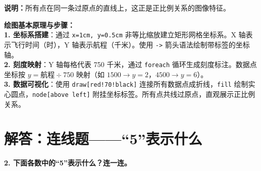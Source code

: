 \documentclass[12pt, a4paper]{ctexrep}
\begin{document}
\begin{center}
\end{center}

\vspace{0.4cm}

{\small\color{gray}
\textbf{说明：}所有点在同一条过原点的直线上，这正是正比例关系的图像特征。}

\vspace{0.6cm}

{\small\color{blue!70!black}
\textbf{绘图基本原理与步骤：}\\
\textbf{1. 坐标系搭建}：通过 \texttt{x=1cm, y=0.5cm} 非等比缩放建立矩形网格坐标系。X 轴表示飞行时间（时），Y 轴表示航程（千米）。使用 \texttt{->} 箭头语法绘制带标签的坐标轴。\\
\textbf{2. 刻度映射}：Y 轴每格代表 750 千米，通过 \texttt{foreach} 循环生成刻度标注。数据点坐标按 $y = \text{航程} \div 750$ 映射（如 $1500 \to y=2$，$4500 \to y=6$）。\\
\textbf{3. 数据可视化}：使用 \texttt{draw[red!70!black]} 连接所有数据点成折线，\texttt{fill} 绘制实心圆点，\texttt{node[above left]} 附挂坐标标签。所有点共线过原点，直观展示正比例关系。
}


\newpage

\section{解答：连线题——“5”表示什么}

\vspace{0.4cm}

\noindent\textbf{2. 下面各数中的“5”表示什么？连一连。}

\vspace{0.8cm}
\end{document}
